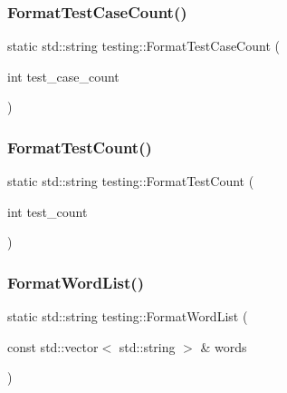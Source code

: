 \mbox{\label{namespacetesting_ab8cabb45f3d8c52d336372c1b62d75c5}} 
\subsubsection{\texorpdfstring{FormatTestCaseCount()}{FormatTestCaseCount()}}
{\footnotesize\ttfamily static std\+::string testing\+::\+Format\+Test\+Case\+Count (\begin{DoxyParamCaption}\item[{int}]{test\+\_\+case\+\_\+count }\end{DoxyParamCaption})\hspace{0.3cm}{\ttfamily [static]}}

\mbox{\label{namespacetesting_a7420a0eb48a02ba210e265afb75febdf}} 
\subsubsection{\texorpdfstring{FormatTestCount()}{FormatTestCount()}}
{\footnotesize\ttfamily static std\+::string testing\+::\+Format\+Test\+Count (\begin{DoxyParamCaption}\item[{int}]{test\+\_\+count }\end{DoxyParamCaption})\hspace{0.3cm}{\ttfamily [static]}}

\mbox{\label{namespacetesting_a4354761948a5cf56fdf905418a0f78f1}} 
\subsubsection{\texorpdfstring{FormatWordList()}{FormatWordList()}}
{\footnotesize\ttfamily static std\+::string testing\+::\+Format\+Word\+List (\begin{DoxyParamCaption}\item[{const std\+::vector$<$ std\+::string $>$ \&}]{words }\end{DoxyParamCaption})\hspace{0.3cm}{\ttfamily [static]}}

